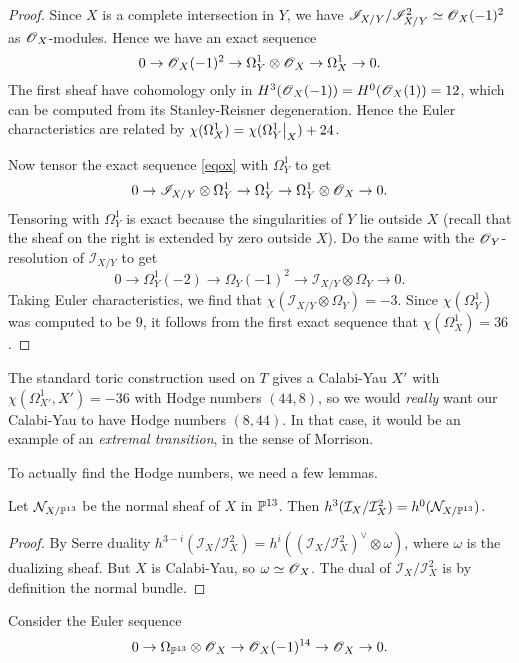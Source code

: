 \documentclass[11pt, english]{article}
\begin{document}
\begin{proof}
Since $X$ is a complete intersection in $Y$, we have $\mathscr I_{X/Y}/\mathscr I_{X/Y}^2 \simeq \operatorname{\mathscr{O}}_X(-1)^2$ as $\operatorname{\mathscr{O}}_X$-modules. Hence we have an exact sequence
\[
0 \to \operatorname{\mathscr{O}}_X(-1)^2 \to \Omega_Y^1 \otimes \operatorname{\mathscr{O}}_X \to \Omega_X^1 \to 0.
\]
The first sheaf have cohomology only in $H^3(\operatorname{\mathscr{O}}_X(-1))=H^0(\operatorname{\mathscr{O}}_X(1))=12$, which can be computed from its Stanley-Reisner degeneration. Hence the Euler characteristics are related by $\chi(\Omega_X^1) = \chi(\restr{\Omega_Y^1}X) + 24$.

Now tensor the exact sequence \eqref{eqox} with $\Omega_Y^1$ to get
\[
0 \to \mathscr I_{X/Y} \otimes \Omega_Y^1 \to \Omega_Y^1 \to \Omega_Y^1 \otimes \operatorname{\mathscr{O}}_X \to 0.
\]
Tensoring with $\Omega_Y^1$ is exact because the singularities of $Y$ lie outside $X$ (recall that the sheaf on the right is extended by zero outside $X$). Do the same with the $\operatorname{\mathscr{O}}_Y$-resolution of $\mathscr I_{X/Y}$ to get
\[
0 \to \Omega_Y^1(-2) \to \Omega_Y(-1)^2 \to \mathscr I_{X/Y} \otimes \Omega_Y \to 0.
\]
Taking Euler characteristics, we find that $\chi(\mathscr I_{X/Y} \otimes \Omega_Y)=-3$. Since $\chi(\Omega_Y^1)$ was computed to be $9$, it follows from the first exact sequence that $\chi(\Omega_X^1)=36$.
\end{proof}
\begin{remark}
The standard toric construction used on $T$ gives a Calabi-Yau $X'$ with $\chi(\Omega_{X'}^1,X')=-36$ with Hodge numbers $(44,8)$, so we would \emph{really} want our Calabi-Yau to have Hodge numbers $(8,44)$. In that case, it would be an example of an \emph{extremal transition}, in the sense of Morrison.
\end{remark}

To actually find the Hodge numbers, we need a few lemmas.

\begin{lemma}
\label{lemmanormal}
Let $\mathcal N_{X/\mathbb{P}^{13}}$ be the normal sheaf of $X$ in $\mathbb{P}^{13}$. Then $h^3(\mathcal I_X/\mathcal I_X^2) = h^0(\mathcal N_{X/\mathbb{P}^{13}})$.
\end{lemma}
\begin{proof}
By Serre duality $h^{3-i}(\mathcal I_X/\mathcal I_X^2)=h^{i}((\mathcal I_X/\mathcal I_X^2)^\vee \otimes \omega)$, where $\omega$ is the dualizing sheaf. But $X$ is Calabi-Yau, so $\omega \simeq \operatorname{\mathscr{O}}_X$. The dual of $\mathcal I_X/\mathcal I_X^2$ is by definition the normal bundle.
\end{proof}

Consider the Euler sequence
\[
0 \to \Omega_{\mathbb{P}^{13}} \otimes \operatorname{\mathscr{O}}_{X} \to \operatorname{\mathscr{O}}_{X}(-1)^{14} \to \operatorname{\mathscr{O}}_X \to 0.
\]
\end{document}
